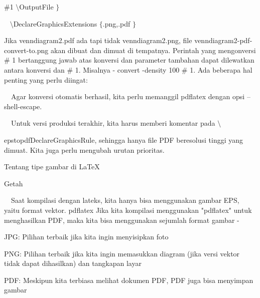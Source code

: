   $  \#  $1  $  \setminus $OutputFile $  \}  $ \par
\vspace{12pt}
\noindent 
~  $  \setminus $DeclareGraphicsExtensions $  \{  $.png,.pdf $  \}  $ \par
\vspace{16pt}
\vspace{16pt}
\noindent 
 \hspace*{0.5in} Jika venndiagram2.pdf ada tapi tidak venndiagram2.png, file venndiagram2-pdf-convert-to.png akan dibuat dan dimuat di tempatnya. Perintah yang mengonversi  $  \#  $ 1 bertanggung jawab atas konversi dan parameter tambahan dapat dilewatkan antara konversi dan  $  \#  $ 1. Misalnya - convert -density 100  $  \#  $ 1. Ada beberapa hal penting yang perlu diingat: \par
\vspace{12pt}
\noindent 
 $  $ $  $ $  $ $  $Agar konversi otomatis berhasil, kita perlu memanggil pdflatex dengan opsi --shell-escape. \par
\vspace{12pt}
\noindent 
 $  $ $  $ $  $ $  $Untuk versi produksi terakhir, kita harus memberi komentar pada  $  \setminus $  \par
\vspace{12pt}
\noindent 
epstopdfDeclareGraphicsRule, sehingga hanya file PDF beresolusi tinggi yang dimuat. Kita juga perlu mengubah urutan prioritas. \par
\vspace{20pt}
\vspace{20pt}
\vspace{20pt}
\noindent 
Tentang tipe gambar di LaTeX \par
\vspace{12pt}
\noindent 
Getah \par
\vspace{12pt}
\noindent 
 $  $ $  $ $  $ $  $Saat kompilasi dengan lateks, kita hanya bisa menggunakan gambar EPS, yaitu format vektor. pdflatex $  $Jika kita kompilasi menggunakan "pdflatex" untuk menghasilkan PDF, maka kita bisa menggunakan sejumlah format gambar - \par
\vspace{12pt}
\noindent 
JPG: Pilihan terbaik jika kita ingin menyisipkan foto \par
\noindent 
PNG: Pilihan terbaik jika kita ingin memasukkan diagram (jika versi vektor tidak dapat dihasilkan) dan tangkapan layar \par
\noindent 
PDF: Meskipun kita terbiasa melihat dokumen PDF, PDF juga bisa menyimpan gambar \par
